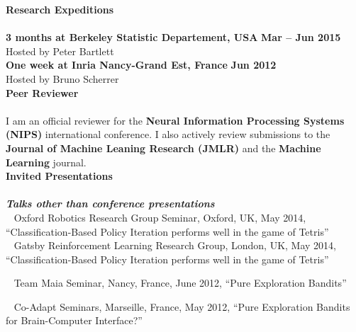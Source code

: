 \noindent\textbf{Research Expeditions}\\[-.4cm]\noindent\makebox[\linewidth]{\rule{\columnwidth}{0.4pt}}\\[.1cm]
\noindent\textbf{3 months at Berkeley Statistic Departement, USA} \hfill \textbf{Mar -- Jun 2015} \\
Hosted by Peter Bartlett\\
\noindent\textbf{One week at Inria Nancy-Grand Est, France} \hfill \textbf{Jun 2012} \\
Hosted by Bruno Scherrer\\

\newpage
\noindent\textbf{Peer Reviewer}\\[-.4cm]\noindent\makebox[\linewidth]{\rule{\columnwidth}{0.4pt}}\\[.1cm]
I am an official reviewer for the \textbf{Neural Information Processing Systems (NIPS)} international conference. I also actively review submissions to the \textbf{Journal of Machine Leaning Research (JMLR)} and the \textbf{Machine Learning} journal.\\

\noindent 
\textbf{Invited Presentations}
\\[-.4cm]\noindent\makebox[\linewidth]{\rule{\columnwidth}{0.4pt}}\\[.1cm]
\textbf{\textit{Talks other than conference presentations}}\\
\textbullet~ Oxford Robotics Research Group Seminar, Oxford, UK, May 2014, 
 ``Classification-Based Policy Iteration performs well in the game of Tetris''\\
\noindent \textbullet~  Gatsby Reinforcement Learning Research Group, London, UK, May 2014, 
 ``Classification-Based Policy Iteration performs well in the game of Tetris''
  
\noindent \textbullet~ Team Maia Seminar, Nancy, France, June 2012, 
 ``Pure Exploration Bandits''
 
\noindent\textbullet~ Co-Adapt Seminars, Marseille, France,  May 2012, 
 ``Pure Exploration Bandits for Brain-Computer Interface?''\\

